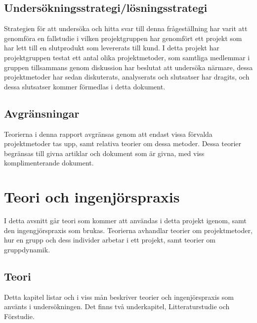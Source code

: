 \documentclass[conference]{IEEEtran}
\begin{document}
\subsection{Undersökningsstrategi/lösningsstrategi}
Strategien för att undersöka och hitta svar till denna frågeställning har varit att genomföra en fallstudie i vilken projektgruppen har genomfört ett projekt som har lett till en slutprodukt som levererats till kund. I detta projekt har projektgruppen testat ett antal olika projektmetoder, som samtliga medlemmar i gruppen tillsammans genom diskussion har beslutat att undersöka närmare, dessa projektmetoder har sedan diskuterats, analyserats och slutsatser har dragits, och dessa slutsatser kommer förmedlas i detta dokument.

\subsection{Avgränsningar}
Teorierna i denna rapport avgränsas genom att endast vissa förvalda projektmetoder tas upp, samt relativa teorier om dessa metoder. Dessa teorier begränsas till givna artiklar och dokument som är givna, med viss komplimenterande dokument.

\section{Teori och ingenjörspraxis}
I detta avsnitt går teori som kommer att användas i detta projekt igenom, samt den ingengjörspraxis som brukas. Teorierna avhandlar teorier om projektmetoder, hur en grupp och dess individer arbetar i ett projekt, samt teorier om gruppdynamik.

\subsection{Teori}
Detta kapitel listar och i viss mån beskriver teorier och ingenjörspraxis som använts i undersökningen. Det finns två underkapitel, Litteraturstudie och Förstudie.
\end{document}
